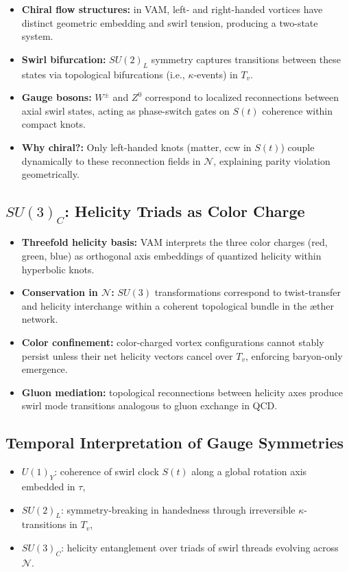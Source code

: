 \begin{itemize}
    \item \textbf{Chiral flow structures:} in VAM, left- and right-handed vortices have distinct geometric embedding and swirl tension, producing a two-state system.
    \item \textbf{Swirl bifurcation:} $SU(2)_L$ symmetry captures transitions between these states via topological bifurcations (i.e., $\kappa$-events) in $T_v$.
    \item \textbf{Gauge bosons:} $W^\pm$ and $Z^0$ correspond to localized reconnections between axial swirl states, acting as phase-switch gates on $S(t)$ coherence within compact knots.
    \item \textbf{Why chiral?:} Only left-handed knots (matter, ccw in $S(t)$) couple dynamically to these reconnection fields in $\mathcal{N}$, explaining parity violation geometrically.
\end{itemize}

\subsection{$SU(3)_C$: Helicity Triads as Color Charge}

\begin{itemize}
    \item \textbf{Threefold helicity basis:} VAM interprets the three color charges (red, green, blue) as orthogonal axis embeddings of quantized helicity within hyperbolic knots.
    \item \textbf{Conservation in $\mathcal{N}$:} $SU(3)$ transformations correspond to twist-transfer and helicity interchange within a coherent topological bundle in the æther network.
    \item \textbf{Color confinement:} color-charged vortex configurations cannot stably persist unless their net helicity vectors cancel over $T_v$, enforcing baryon-only emergence.
    \item \textbf{Gluon mediation:} topological reconnections between helicity axes produce swirl mode transitions analogous to gluon exchange in QCD.
\end{itemize}

\subsection{Temporal Interpretation of Gauge Symmetries}

\begin{itemize}
    \item \textbf{$U(1)_Y$}: coherence of swirl clock $S(t)$ along a global rotation axis embedded in $\tau$,
    \item \textbf{$SU(2)_L$}: symmetry-breaking in handedness through irreversible $\kappa$-transitions in $T_v$,
    \item \textbf{$SU(3)_C$}: helicity entanglement over triads of swirl threads evolving across $\mathcal{N}$.
\end{itemize}

